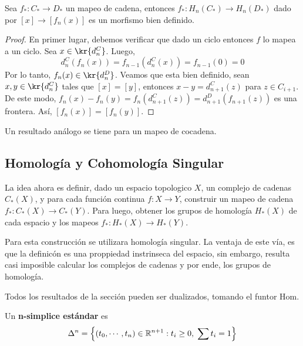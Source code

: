 \documentclass{article}
\begin{document}
\begin{lema}
    Sea $f_{*}:C_{*}\to D_{*}$ un mapeo de cadena, entonces $f_{*}:H_{n}(C_{*})\to H_{n}(D_{*})$
    dado por $[x]\to [f_{n}(x)]$ es un morfismo bien definido.
\end{lema}
\begin{proof}
    En primer lugar, debemos verificar que dado un ciclo entonces $f$ lo mapea a un ciclo. 
    Sea $x\in\kr{d_{n}^{C}}$. Luego,
    \begin{equation*}
        d_{n}^{C}(f_{n}(x))=f_{n-1}(d_{n}^{C}(x))=f_{n-1}(0)=0
    \end{equation*}
    Por lo tanto, $f_{n}(x)\in\kr{d_{n}^{D}}$. Veamos que esta bien definido, sean 
    $x,y\in\kr{d_{n}^{C}}$ tales que $[x]=[y]$, entonces $x-y=d_{n+1}^{C}(z)$ para $z\in C_{i+1}$.
    De este modo, $f_{n}(x)-f_{n}(y)=f_{n}(d_{n+1}^{C}(z))=d_{n+1}^{D}(f_{n+1}(z))$ es una 
    frontera. Así, $[f_{n}(x)]=[f_{n}(y)]$.
\end{proof}

\noindent Un resultado análogo se tiene para un mapeo de cocadena.

\subsection{Homología y Cohomología Singular}
\noindent La idea ahora es definir, dado un espacio topologico $X$, un complejo de cadenas 
$C_{*}(X)$, y para cada función continua $f:X\to Y$, construir un mapeo de cadena $f_{*}:C_{*}(X)
\to C_{*}(Y)$. Para luego, obtener los grupos de homología $H_{*}(X)$ de cada espacio y los mapeos
$f_{*}:H_{*}(X)\to H_{*}(Y)$.

\noindent Para esta construcción se utilizara homología singular. La ventaja de este vía, es que
la definicón es una proppiedad instrinseca del espacio, sin embargo, resulta casi imposible 
calcular los complejos de cadenas y por ende, los grupos de homología.

\noindent Todos los resultados de la sección pueden ser dualizados, tomando el funtor Hom.

\begin{dfn}
    Un \textbf{n-simplice estándar} es
    \begin{equation*}
        \Delta^{n}=\left\{
            (t_{0},\cdots,t_{n})\in\mathbb{R}^{n+1}:t_{i}\geq0,\hspace{1mm}\sum t_{i}=1
        \right\}
    \end{equation*}
\end{dfn}
\end{document}

